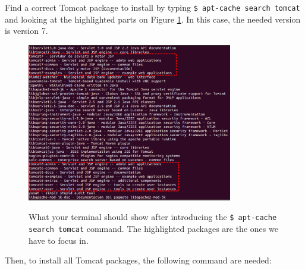 \documentclass[a4paper,11pt]{book}
\begin{document}
Find a correct Tomcat package to install by typing \texttt{\$ apt-cache search tomcat} and looking at the highlighted parts on Figure \ref{fig:tomcatpackages}. In this case, the needed version is version 7.

\begin{figure}
  \begin{center}
    \includegraphics[width=0.8\textwidth]{./Figures/tomcatpackages.png}
    \label{fig:tomcatpackages}
    \caption{What your terminal should show after introducing the \texttt{\$ apt-cache search tomcat} command. The highlighted packages are the ones we have to focus in.}
  \end{center}
\end{figure}

Then, to install all Tomcat packages, the following command are needed:




\end{document}
